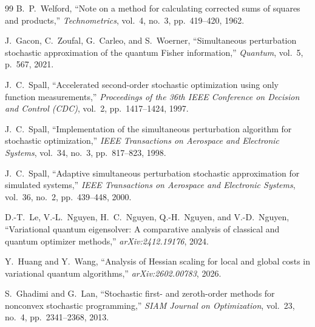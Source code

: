 \documentclass[11pt,a4paper]{article}
\begin{document}
\begin{thebibliography}{99}
B.~P.~Welford,
\newblock ``Note on a method for calculating corrected sums of squares and products,''
\newblock \emph{Technometrics}, vol.~4, no.~3, pp.~419--420, 1962.

J.~Gacon, C.~Zoufal, G.~Carleo, and S.~Woerner,
\newblock ``Simultaneous perturbation stochastic approximation of the quantum Fisher information,''
\newblock \emph{Quantum}, vol.~5, p.~567, 2021.

J.~C.~Spall,
\newblock ``Accelerated second-order stochastic optimization using only function measurements,''
\newblock \emph{Proceedings of the 36th IEEE Conference on Decision and Control (CDC)}, vol.~2, pp.~1417--1424, 1997.

J.~C.~Spall,
\newblock ``Implementation of the simultaneous perturbation algorithm for stochastic optimization,''
\newblock \emph{IEEE Transactions on Aerospace and Electronic Systems}, vol.~34, no.~3, pp.~817--823, 1998.

J.~C.~Spall,
\newblock ``Adaptive simultaneous perturbation stochastic approximation for simulated systems,''
\newblock \emph{IEEE Transactions on Aerospace and Electronic Systems}, vol.~36, no.~2, pp.~439--448, 2000.

D.-T.~Le, V.-L.~Nguyen, H.~C.~Nguyen, Q.-H.~Nguyen, and V.-D.~Nguyen,
\newblock ``Variational quantum eigensolver: A comparative analysis of classical and quantum optimizer methods,''
\newblock \emph{arXiv:2412.19176}, 2024.

Y.~Huang and Y.~Wang,
\newblock ``Analysis of Hessian scaling for local and global costs in variational quantum algorithms,''
\newblock \emph{arXiv:2602.00783}, 2026.

S.~Ghadimi and G.~Lan,
\newblock ``Stochastic first- and zeroth-order methods for nonconvex stochastic programming,''
\newblock \emph{SIAM Journal on Optimization}, vol.~23, no.~4, pp.~2341--2368, 2013.

\end{thebibliography}
\end{document}
